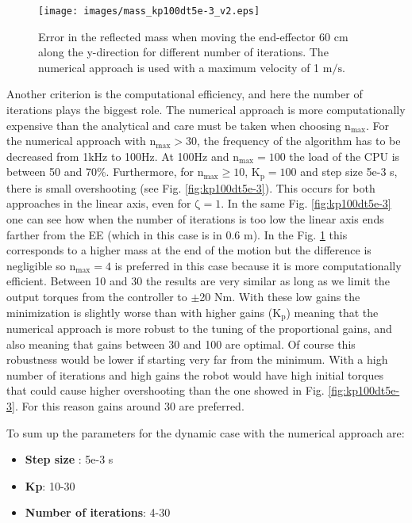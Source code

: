 \begin{figure}[!htb]
	\centerline{
		\texttt{[image: images/mass\_kp100dt5e-3\_v2.eps]}}
	\caption{Error in the reflected mass when moving the end-effector 60 cm along the y-direction for different number of iterations. The numerical approach is used with a maximum velocity of 1 $\mathrm{m/s}$.}
	\label{fig:mass_kp100dt5e-3}
\end{figure}

Another criterion is the computational efficiency, and here the number of iterations plays the biggest role. The numerical approach is more computationally expensive than the analytical and care must be taken when choosing $\mathrm{n_{max}}$. For the numerical approach with $\mathrm{n_{max} > 30}$, the frequency of the algorithm has to be decreased from 1kHz to 100Hz.  At 100Hz and $\mathrm{n_{max} = 100}$ the load of the CPU is between 50 and 70\%. Furthermore, for  $\mathrm{n_{max} \ge 10}$,  $\mathrm{K_p=100}$ and step size 5e-3 s,  there is small overshooting (see Fig. \ref{fig:kp100dt5e-3}). This occurs for both approaches in the linear axis, even for $\mathrm{\zeta = 1}$. In the same Fig. \ref{fig:kp100dt5e-3} one can see how when the number of iterations is too low the linear axis ends farther from the EE (which in this case is in 0.6 m). In the Fig. \ref{fig:mass_kp100dt5e-3} this corresponds to a higher mass at the end of the motion but the difference is negligible so $\mathrm{n_{max} = 4}$ is preferred in this case because it is more computationally efficient. 
Between 10 and 30 the results are very similar as long as we limit the output torques from the controller to $\pm$20 Nm. With these low gains the minimization is slightly worse than with higher gains ($\mathrm{K_p}$) meaning that the numerical approach is more robust to the tuning of the proportional gains, and also meaning that gains between 30 and 100 are optimal.
Of course this robustness would be lower if starting very far from the minimum. With a high number of iterations and high gains the robot would have high initial torques that could cause higher overshooting than the one showed in Fig. \ref{fig:kp100dt5e-3}. For this reason gains around 30 are preferred. 

To sum up the parameters for the dynamic case with the numerical approach are:
 \begin{itemize}  
 	\item \textbf{Step size} : 5e-3 s
 	\item \textbf{Kp}: 10-30
    \item \textbf{Number of iterations}: 4-30
  \end{itemize} 
 
